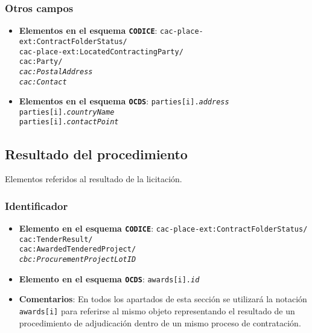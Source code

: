        \subsubsection{Otros campos}
            \begin{itemize}
                \item \textbf{Elementos en el esquema \texttt{CODICE}}:
                    \tabto{7.6cm} \texttt{cac-place-ext:ContractFolderStatus/} \\
                    \tabto{7.6cm} \texttt{cac-place-ext:LocatedContractingParty/} \\
                    \tabto{7.6cm} \texttt{cac:Party/} \\
                    \tabto{7.6cm} \texttt{\textit{cac:PostalAddress}} \\
                    \tabto{7.6cm} \texttt{\textit{cac:Contact}} \\
                \item \textbf{Elementos en el esquema \texttt{OCDS}}:
                    \tabto{7.6cm} \texttt{parties[i].\textit{address}} \\
                    \tabto{7.6cm} \texttt{parties[i].\textit{countryName}} \\
                    \tabto{7.6cm} \texttt{parties[i].\textit{contactPoint}}
            \end{itemize}
    
    \vspace{0.3cm}
    
    \subsection{Resultado del procedimiento}
        
        Elementos referidos al resultado de la licitación.
    
        \subsubsection{Identificador}
            \begin{itemize}
                \item \textbf{Elemento en el esquema \texttt{CODICE}}:
                    \tabto{7.6cm} \texttt{cac-place-ext:ContractFolderStatus/} \\
                    \tabto{7.6cm} \texttt{cac:TenderResult/} \\
                    \tabto{7.6cm} \texttt{cac:AwardedTenderedProject/} \\
                    \tabto{7.6cm} \texttt{\textit{cbc:ProcurementProjectLotID}}
                \item \textbf{Elemento en el esquema \texttt{OCDS}}:
                    \tabto{7.6cm} \texttt{awards[i].\textit{id}}
                \item \textbf{Comentarios}: En todos los apartados de esta sección se utilizará la notación \texttt{awards[i]} para referirse al mismo objeto representando el resultado de un procedimiento de adjudicación dentro de un mismo proceso de contratación.
            \end{itemize}
            
